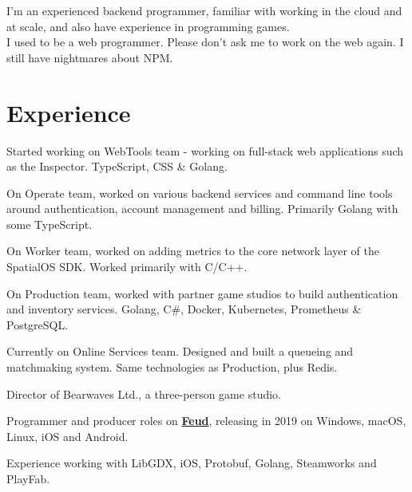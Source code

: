 \documentclass[]{deedy-resume-openfont}
\begin{document}
\begin{minipage}[t]{0.63\textwidth} 


\sectionsep
I'm an experienced backend programmer, familiar with working in the cloud and at scale, and also have experience in programming games.\\
I used to be a web programmer. Please don't ask me to work on the web again. I still have nightmares about NPM.
\sectionsep

\section{Experience}

\begin{tightemize}
\item Started working on WebTools team - working on full-stack web applications such as the Inspector. TypeScript, CSS \& Golang.
\item On Operate team, worked on various backend services and command line tools around authentication, account management and billing. Primarily Golang with some TypeScript.
\item On Worker team, worked on adding metrics to the core network layer of the SpatialOS SDK. Worked primarily with C/C++.
\item On Production team, worked with partner game studios to build authentication and inventory services. Golang, C\#, Docker, Kubernetes, Prometheus \& PostgreSQL.
\item Currently on Online Services team. Designed and built a queueing and matchmaking system. Same technologies as Production, plus Redis.
\end{tightemize}
\sectionsep

\begin{tightemize}
\item Director of Bearwaves Ltd., a three-person game studio.
\item Programmer and producer roles on \href{https://store.steampowered.com/app/863400/Feud}{\bf{Feud}}, releasing in 2019 on Windows, macOS, Linux, iOS and Android.
\item Experience working with LibGDX, iOS, Protobuf, Golang, Steamworks and PlayFab.
\end{tightemize}
\sectionsep


\end{minipage}
\end{document}
